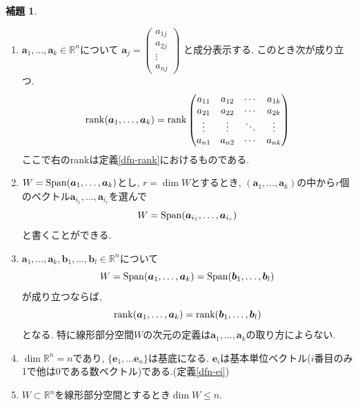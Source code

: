 \documentclass[dvipdfmx,a4paper,11pt]{article}
\newcommand{\R}{\mathbb{R}}
\theoremstyle{definition}
\newtheorem{lem}[thm]{補題}
\begin{document}
\begin{tcolorbox}[
    colback = white,
    colframe = green!35!black,
    fonttitle = \bfseries,
    breakable = true]
    \begin{lem}
 \begin{enumerate}
   \setlength{\parskip}{0cm} 
  \setlength{\itemsep}{0cm}
  \item $\bm{a}_1, \ldots, \bm{a}_k\in \R^n$について
  $
  \bm{a}_j=
    \begin{pmatrix}
    a_{1j}\\a_{2j}\\\vdots\\a_{nj}
    \end{pmatrix}
    $
  と成分表示する. 
  このとき次が成り立つ. 
  $$
  {\rm rank}(\bm{a}_1, \ldots, \bm{a}_k)
  =
  {\rm rank}\begin{pmatrix}
a_{11}& a_{12} & \cdots &a_{1k} \\
a_{21}& a_{22} & \cdots &a_{2k} \\
\vdots& \vdots	&	\ddots   &	\vdots \\
a_{n1}& a_{n2} & \cdots &a_{nk} \\
\end{pmatrix}
$$
  ここで右のrankは定義\ref{dfn-rank}におけるものである. 
  \item $ W={\rm Span}(\bm{a}_1, \ldots, \bm{a}_k)$とし, $r =\dim W$とするとき, $(\bm{a}_1, \ldots, \bm{a}_k)$の中から$r$個のベクトル$\bm{a}_{i_1}, \ldots, \bm{a}_{i_r}$を選んで
  $$
  W={\rm Span}(\bm{a}_{i_1}, \ldots, \bm{a}_{i_r})
  $$
  と書くことができる. 
    \item $\bm{a}_1, \ldots, \bm{a}_k, \bm{b}_1, \ldots, \bm{b}_l\in \R^n$について
    $$
    W={\rm Span}(\bm{a}_1, \ldots, \bm{a}_k)={\rm Span}(\bm{b}_1, \ldots, \bm{b}_l)
    $$
    が成り立つならば, 
    $$
    {\rm rank}(\bm{a}_1, \ldots, \bm{a}_k)={\rm rank}(\bm{b}_1, \ldots, \bm{b}_l)
    $$
    となる. 特に線形部分空間$W$の次元の定義は$\bm{a}_1, \ldots, \bm{a}_k$の取り方によらない. 
    \item $\dim \R^n=n$であり, $\{ \bm{e}_1, \ldots \bm{e}_n\}$は基底になる. $\bm{e}_i$は基本単位ベクトル($i$番目のみ1で他は0である数ベクトル)である.(定義\ref{dfn-ei})
    \item $W \subset \R^n$を線形部分空間とするとき$\dim W \le n$.
 \end{enumerate}
  \end{lem}
  \end{tcolorbox}
\end{document}
